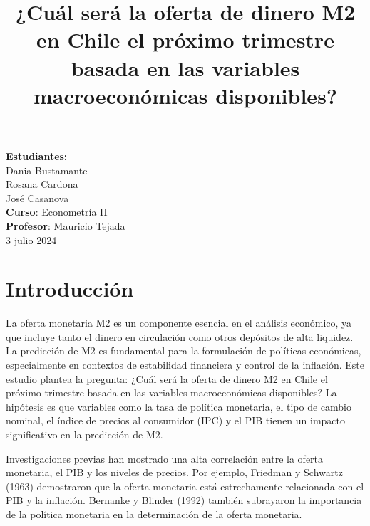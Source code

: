\documentclass[
  12pt,
]{article}
\title{\textbf{¿Cuál será la oferta de dinero M2 en Chile el próximo
trimestre basada en las variables macroeconómicas disponibles?}}
\author{}
\date{\vspace{-2.5em}}
\begin{document}
\maketitle

\maketitle
\vspace{4cm}
\begin{center}
\large \textbf{Estudiantes:} \\
\vspace{0.5cm}
\large Dania Bustamante \\
\large Rosana Cardona \\
\large José Casanova \\
\vfill
\large \textbf{Curso}: Econometría II \\
\large \textbf{Profesor}: Mauricio Tejada \\
\large 3 julio 2024 \\
\vspace{1cm}
\end{center}
\newpage
\tableofcontents
\newpage

\section{Introducción}\label{introducciuxf3n}

La oferta monetaria M2 es un componente esencial en el análisis
económico, ya que incluye tanto el dinero en circulación como otros
depósitos de alta liquidez. La predicción de M2 es fundamental para la
formulación de políticas económicas, especialmente en contextos de
estabilidad financiera y control de la inflación. Este estudio plantea
la pregunta: ¿Cuál será la oferta de dinero M2 en Chile el próximo
trimestre basada en las variables macroeconómicas disponibles? La
hipótesis es que variables como la tasa de política monetaria, el tipo
de cambio nominal, el índice de precios al consumidor (IPC) y el PIB
tienen un impacto significativo en la predicción de M2.

Investigaciones previas han mostrado una alta correlación entre la
oferta monetaria, el PIB y los niveles de precios. Por ejemplo, Friedman
y Schwartz (1963) demostraron que la oferta monetaria está estrechamente
relacionada con el PIB y la inflación. Bernanke y Blinder (1992) también
subrayaron la importancia de la política monetaria en la determinación
de la oferta monetaria.
\end{document}
